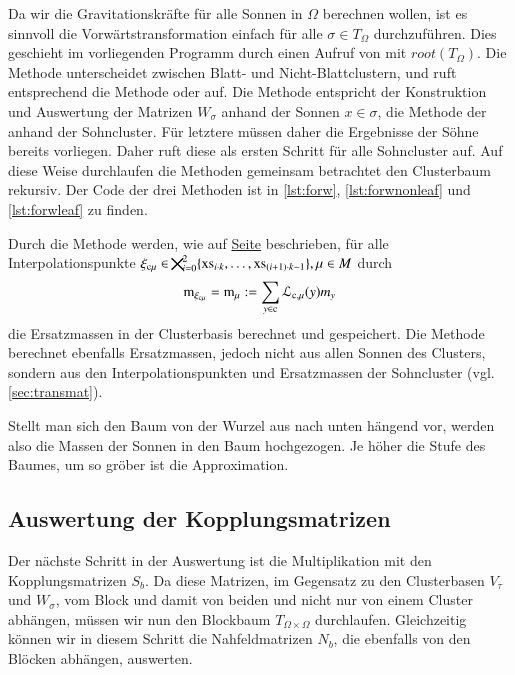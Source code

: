     Da wir die Gravitationskräfte für alle Sonnen in $\Omega$ berechnen wollen, ist es sinnvoll die Vorwärtstransformation einfach für alle $\sigma \in T_\Omega$ durchzuführen. Dies geschieht
    im vorliegenden Programm durch einen Aufruf von  mit $root(T_\Omega)$.
    Die Methode  unterscheidet zwischen Blatt- und Nicht-Blattclustern, und ruft entsprechend die Methode  oder 
    auf. Die Methode  entspricht der Konstruktion und Auswertung der Matrizen $W_\sigma$ anhand der Sonnen $x \in \sigma$, die Methode  
    der anhand der Sohncluster.
    Für letztere müssen daher die Ergebnisse der Söhne bereits vorliegen. Daher ruft diese als ersten Schritt  für alle Sohncluster  auf. Auf diese Weise durchlaufen die 
    Methoden gemeinsam betrachtet den Clusterbaum rekursiv. Der Code der drei Methoden ist in \autoref{lst:forw}, \autoref{lst:forwnonleaf} und \autoref{lst:forwleaf} zu finden.
    
    Durch die Methode  werden, wie auf \hyperref[w:ersatzmassen]{Seite} \pageref{w:ersatzmassen} beschrieben, für alle Interpolationspunkte 
    $\xi_{\tcode{c}\mu} \in \bigtimes_{i=0}^2 \{\tcode{xs}_{i \cdot k}, \dots ,\tcode{xs}_{(i+1) \cdot k-1}\}, \mu \in M$ durch
    \[
      \tcode{m}_{\xi_{\tcode{c}\mu}} = \tcode{m}_\mu := \sum_{y \in \tcode{c}} \lag_{\tcode{c},\mu}(y) m_y
    \]
    die Ersatzmassen in der Clusterbasis berechnet und gespeichert. Die Methode  berechnet ebenfalls Ersatzmassen, jedoch nicht aus allen Sonnen des Clusters,
    sondern aus den Interpolationspunkten und Ersatzmassen der Sohncluster (vgl. \autoref{sec:transmat}).
    
    Stellt man sich den Baum von der Wurzel aus nach unten hängend vor, werden also die Massen der Sonnen in den Baum hochgezogen. Je höher die Stufe des Baumes, um so gröber ist die Approximation.
    
    
    \subsection{Auswertung der Kopplungsmatrizen}
    \label{sec:kopplung}
    Der nächste Schritt in der Auswertung ist die Multiplikation mit den Kopplungsmatrizen $S_b$. Da diese Matrizen, im Gegensatz zu den Clusterbasen $V_\tau$ und $W_\sigma$, vom Block und damit
    von beiden und nicht nur von einem Cluster abhängen, müssen wir nun den Blockbaum $T_{\Omega \times \Omega}$ durchlaufen. 
    Gleichzeitig können wir in diesem Schritt die Nahfeldmatrizen $N_b$, die ebenfalls von den Blöcken abhängen, auswerten. 
    

